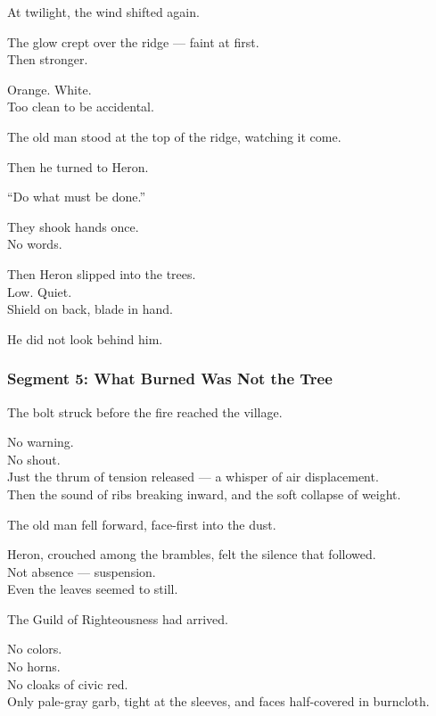 \documentclass[9pt]{article}
\begin{document}
\vspace{1em}

At twilight, the wind shifted again.

The glow crept over the ridge — faint at first.\\
Then stronger.

Orange. White.\\
Too clean to be accidental.

The old man stood at the top of the ridge, watching it come.

Then he turned to Heron.

\vspace{1em}

“Do what must be done.”

\vspace{1em}

They shook hands once.\\
No words.

Then Heron slipped into the trees.\\
Low. Quiet.\\
Shield on back, blade in hand.

He did not look behind him.

\newpage

\subsubsection*{Segment 5: What Burned Was Not the Tree}

The bolt struck before the fire reached the village.

No warning.\\
No shout.\\
Just the thrum of tension released — a whisper of air displacement.\\
Then the sound of ribs breaking inward, and the soft collapse of weight.

The old man fell forward, face-first into the dust.

Heron, crouched among the brambles, felt the silence that followed.\\
Not absence — suspension.\\
Even the leaves seemed to still.

\vspace{1em}

The Guild of Righteousness had arrived.

No colors.\\
No horns.\\
No cloaks of civic red.\\
Only pale-gray garb, tight at the sleeves, and faces half-covered in burncloth.
\end{document}
